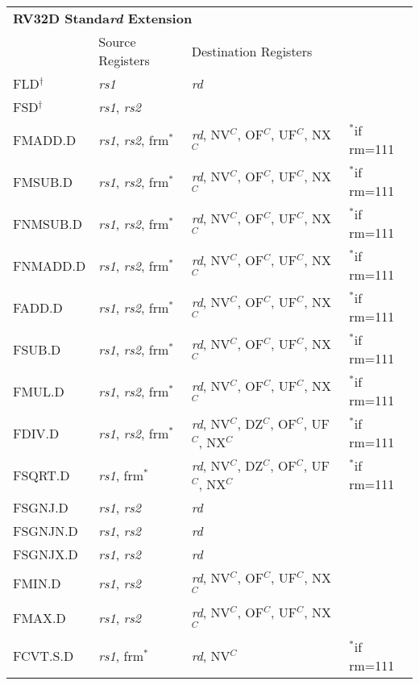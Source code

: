 \begin{tabular}{p{25mm}|p{3cm}|p{6cm}|p{10cm}}
  \multicolumn{4}{l}{\bf RV32D Standa{\em rd} Extension} \\
  \cline{2-3}
   & Source Registers & Destination Registers \\
  \cline{2-3}
   FLD$^\dagger$ & {\em rs1} & {\em rd} &  \\
   \cline{2-3}
   FSD$^\dagger$ & {\em rs1}, {\em rs2} &  &  \\
   \cline{2-3}
   FMADD.D & {\em rs1}, {\em rs2}, frm$^*$ & {\em rd}, NV$^C$, OF$^C$, UF$^C$, NX$^C$ & $^*$if rm=111 \\
   \cline{2-3}
   FMSUB.D & {\em rs1}, {\em rs2}, frm$^*$ & {\em rd}, NV$^C$, OF$^C$, UF$^C$, NX$^C$ & $^*$if rm=111 \\
   \cline{2-3}
   FNMSUB.D & {\em rs1}, {\em rs2}, frm$^*$ & {\em rd}, NV$^C$, OF$^C$, UF$^C$, NX$^C$ & $^*$if rm=111 \\
   \cline{2-3}
   FNMADD.D & {\em rs1}, {\em rs2}, frm$^*$ & {\em rd}, NV$^C$, OF$^C$, UF$^C$, NX$^C$ & $^*$if rm=111 \\
   \cline{2-3}
   FADD.D & {\em rs1}, {\em rs2}, frm$^*$ & {\em rd}, NV$^C$, OF$^C$, UF$^C$, NX$^C$ & $^*$if rm=111 \\
   \cline{2-3}
   FSUB.D & {\em rs1}, {\em rs2}, frm$^*$ & {\em rd}, NV$^C$, OF$^C$, UF$^C$, NX$^C$ & $^*$if rm=111 \\
   \cline{2-3}
   FMUL.D & {\em rs1}, {\em rs2}, frm$^*$ & {\em rd}, NV$^C$, OF$^C$, UF$^C$, NX$^C$ & $^*$if rm=111 \\
   \cline{2-3}
   FDIV.D & {\em rs1}, {\em rs2}, frm$^*$ & {\em rd}, NV$^C$, DZ$^C$, OF$^C$, UF$^C$, NX$^C$ & $^*$if rm=111 \\
   \cline{2-3}
   FSQRT.D & {\em rs1}, frm$^*$ & {\em rd}, NV$^C$, DZ$^C$, OF$^C$, UF$^C$, NX$^C$ & $^*$if rm=111 \\
   \cline{2-3}
   FSGNJ.D & {\em rs1}, {\em rs2} & {\em rd} &  \\
   \cline{2-3}
   FSGNJN.D & {\em rs1}, {\em rs2} & {\em rd} &  \\
   \cline{2-3}
   FSGNJX.D & {\em rs1}, {\em rs2} & {\em rd} &  \\
   \cline{2-3}
   FMIN.D & {\em rs1}, {\em rs2} & {\em rd}, NV$^C$, OF$^C$, UF$^C$, NX$^C$ &  \\
   \cline{2-3}
   FMAX.D & {\em rs1}, {\em rs2} & {\em rd}, NV$^C$, OF$^C$, UF$^C$, NX$^C$ &  \\
   \cline{2-3}
   FCVT.S.D & {\em rs1}, frm$^*$ & {\em rd}, NV$^C$ & $^*$if rm=111 \\

\end{tabular}
